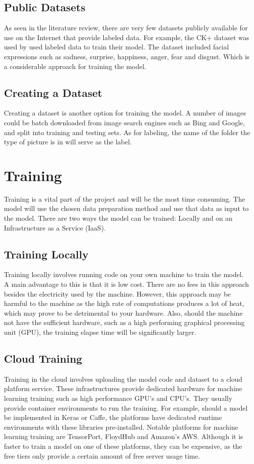 \subsection{Public Datasets}
As seen in the literature review, there are very few datasets publicly available for use on the Internet that provide labeled data. For example, the CK+ dataset was used by \citeauthor{LOPES} used labeled data to train their model. The dataset included facial expressions such as sadness, surprise, happiness, anger, fear and disgust. Which is a considerable approach for training the model.

\subsection{Creating a Dataset}
Creating a dataset is another option for training the model. A number of images could be batch downloaded from image search engines such as Bing and Google, and split into training and testing sets. As for labeling, the name of the folder the type of picture is in will serve as the label.

\section{Training}
Training is a vital part of the project and will be the most time consuming. The model will use the chosen data preparation method and use that data as input to the model. There are two ways the model can be trained: Locally and on an Infrastructure as a Service (IaaS).

\subsection{Training Locally}
Training locally involves running code on your own machine to train the model. A main advantage to this is that it is low cost. There are no fees in this approach besides the electricity used by the machine. However, this approach may be harmful to the machine as the high rate of computations produces a lot of heat, which may prove to be detrimental to your hardware. Also, should the machine not have the sufficient hardware, such as a high performing graphical processing unit (GPU), the training elapse time will be significantly larger.

\subsection{Cloud Training}
Training in the cloud involves uploading the model code and dataset to a cloud platform service. These infrastructures provide dedicated hardware for machine learning training such as high performance GPU's and CPU's. They usually provide container environments to run the training. For example, should a model be implemented in Keras or Caffe, the platforms have dedicated runtime environments with these libraries pre-installed. Notable platforms for machine learning training are TensorPort, FloydHub and Amazon's AWS. Although it is faster to train a model on one of these platforms, they can be expensive, as the free tiers only provide a certain amount of free server usage time.

